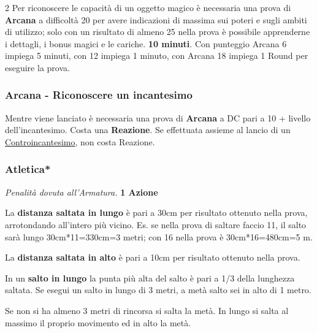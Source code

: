 \begin{multicols}{2}
Per riconoscere le capacità di un oggetto magico è necessaria una prova di \textbf{Arcana} a difficoltà 20 per avere indicazioni di massima sui poteri e sugli ambiti di utilizzo; solo con un risultato di almeno 25 nella prova è possibile apprenderne i dettagli, i bonus magici e le cariche. \textbf{10 minuti}. Con punteggio Arcana 6 impiega 5 minuti, con 12 impiega 1 minuto, con Arcana 18 impiega 1 Round per eseguire la prova.

\titlespacing*{\subsubsection}{0pt}{0.5em}{0.5em}\subsubsection*{Arcana - Riconoscere un incantesimo}  \label{riconoscereincantesimo}\hypertarget{riconoscereincantesimo}{}
Mentre viene lanciato è necessaria una prova di \textbf{Arcana} a DC pari a 10 + livello dell'incantesimo. Costa una \textbf{Reazione}. Se effettuata assieme al lancio di un \hyperlink{Controincantesimo}{Controincantesimo}, non costa Reazione.

\titlespacing*{\subsubsection}{0pt}{0.5em}{0.5em}\subsubsection*{Atletica*} \emph{Penalità dovuta all'Armatura.} \textbf{1 Azione}\label{atletica}\label{saltare}

La \textbf{distanza saltata in lungo} è pari a 30cm per risultato ottenuto nella prova, arrotondando all'intero più vicino. Es. se nella prova di saltare faccio 11, il salto sarà lungo 30cm*11=330cm=3 metri; con 16 nella prova è 30cm*16=480cm=5 m.

La \textbf{distanza saltata in alto} è pari a 10cm per risultato ottenuto nella prova.

In un \textbf{salto in lungo} la punta più alta del salto è pari a 1/3 della lunghezza saltata. Se esegui un salto in lungo di 3 metri, a metà salto sei in alto di 1 metro.

Se non si ha almeno 3 metri di rincorsa si salta la metà. In lungo si salta al massimo il proprio movimento ed in alto la metà.


\end{multicols}
